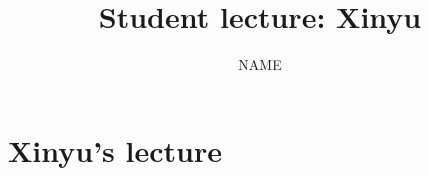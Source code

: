 \documentclass[11pt,reqno,oneside,a4paper]{article}
\title{Student lecture: Xinyu}
\author{NAME}
\begin{document}

\maketitle
\thispagestyle{fancy}


\section{Xinyu's lecture} \label{sec:Xinyu}

\end{document}
